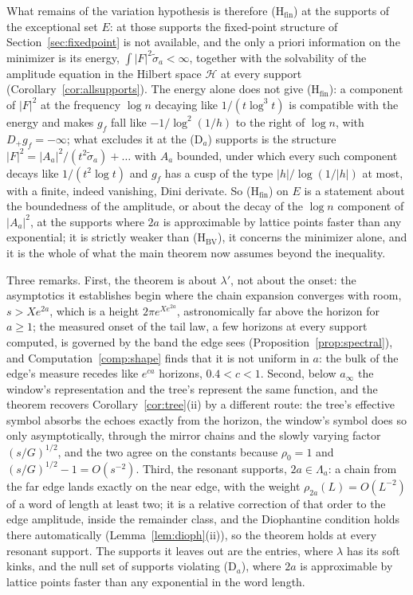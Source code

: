 \documentclass[11pt]{article}
\theoremstyle{definition}
\theoremstyle{remark}
\begin{document}
What remains of the variation hypothesis is therefore (H$_{\mathrm{fin}}$) at the supports of the exceptional set $E$: at those supports the fixed-point structure of Section~\ref{sec:fixedpoint} is not available, and the only a priori information on the minimizer is its energy, $\int|F|^2\tilde\sigma_a<\infty$, together with the solvability of the amplitude equation in the Hilbert space $\mathcal H$ at every support (Corollary~\ref{cor:allsupports}). The energy alone does not give (H$_{\mathrm{fin}}$): a component of $|F|^2$ at the frequency $\log n$ decaying like $1/(t\log^3t)$ is compatible with the energy and makes $g_f$ fall like $-1/\log^2(1/h)$ to the right of $\log n$, with $D_+g_f=-\infty$; what excludes it at the (D$_a$) supports is the structure $|F|^2=|A_a|^2/(t^2\tilde\sigma_a)+\dots$ with $A_a$ bounded, under which every such component decays like $1/(t^2\log t)$ and $g_f$ has a cusp of the type $|h|/\log(1/|h|)$ at most, with a finite, indeed vanishing, Dini derivate. So (H$_{\mathrm{fin}}$) on $E$ is a statement about the boundedness of the amplitude, or about the decay of the $\log n$ component of $|A_a|^2$, at the supports where $2a$ is approximable by lattice points faster than any exponential; it is strictly weaker than (H$_{\mathrm{BV}}$), it concerns the minimizer alone, and it is the whole of what the main theorem now assumes beyond the inequality.



Three remarks. First, the theorem is about $\lambda'$, not about the onset: the asymptotics it establishes begin where the chain expansion converges with room, $s>Xe^{2a}$, which is a height $2\pi e^{Xe^{2a}}$, astronomically far above the horizon for $a\ge1$; the measured onset of the tail law, a few horizons at every support computed, is governed by the band the edge sees (Proposition~\ref{prop:spectral}), and Computation~\ref{comp:shape} finds that it is not uniform in $a$: the bulk of the edge's measure recedes like $e^{ca}$ horizons, $0.4<c<1$. Second, below $a_\infty$ the window's representation and the tree's represent the same function, and the theorem recovers Corollary~\ref{cor:tree}(ii) by a different route: the tree's effective symbol absorbs the echoes exactly from the horizon, the window's symbol does so only asymptotically, through the mirror chains and the slowly varying factor $(s/G)^{1/2}$, and the two agree on the constants because $\rho_0=1$ and $(s/G)^{1/2}-1=O(s^{-2})$. Third, the resonant supports, $2a\in\Lambda_a$: a chain from the far edge lands exactly on the near edge, with the weight $\rho_{2a}(L)=O(L^{-2})$ of a word of length at least two; it is a relative correction of that order to the edge amplitude, inside the remainder class, and the Diophantine condition holds there automatically (Lemma~\ref{lem:dioph}(ii)), so the theorem holds at every resonant support. The supports it leaves out are the entries, where $\lambda$ has its soft kinks, and the null set of supports violating (D$_a$), where $2a$ is approximable by lattice points faster than any exponential in the word length.
\end{document}
